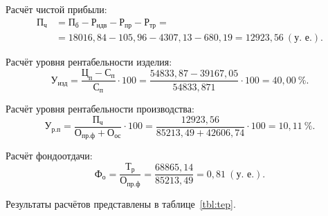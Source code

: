 Расчёт чистой прибыли:
\begin{align*}
  \text{П}_{\text{ч}} &= \text{П}_{\text{б}} - 
  \text{Р}_{\text{ндв}} - \text{Р}_{\text{пр}}  - \text{Р}_{\text{тр}} = \\
  &= 18016{,}84 - 105{,}96 - 4307{,}13 - 680{,}19 =
  12923{,}56 \: (\text{у.~е.}).
\end{align*}

Расчёт уровня рентабельности изделия:
\begin{equation*}
  \text{У}_{\text{изд}} = 
  \dfrac{\text{Ц}_{\text{п}} - \text{С}_{\text{п}}}{\text{С}_{\text{п}}} \cdot 100 =
  \dfrac{54833{,}87 - 39167{,}05}{54833{,}871} \cdot 100 =
  40{,}00 \: \%. 
\end{equation*}

Расчёт уровня рентабельности производства:
\begin{equation*}
  \text{У}_{\text{р.п}} = 
  \dfrac{\text{П}_{\text{ч}}}{\text{О}_{\text{пр.ф}} + \text{О}_{\text{ос}}} \cdot 100 =
  \dfrac{12923{,}56}{85213{,}49 + 42606{,}74} \cdot 100 =
  10{,}11 \: \%. 
\end{equation*}

Расчёт фондоотдачи:
\begin{equation*}
  \text{Ф}_{\text{о}} = 
  \dfrac{\text{Т}_{\text{р}}}{\text{О}_{\text{пр.ф}}} =
  \dfrac{68865{,}14}{85213{,}49} =
  0{,}81 \: (\text{у.~е.}). 
\end{equation*}

Результаты расчётов представлены в таблице~\ref{tbl:tep}.

